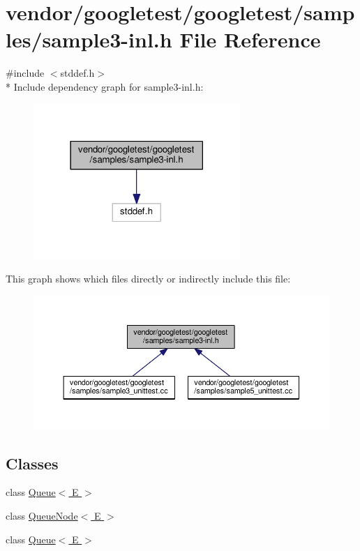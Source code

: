 \hypertarget{sample3-inl_8h}{}\section{vendor/googletest/googletest/samples/sample3-\/inl.h File Reference}
\label{sample3-inl_8h}
{\ttfamily \#include $<$stddef.\+h$>$}\\*
Include dependency graph for sample3-\/inl.h\+:
\nopagebreak
\begin{figure}[H]
\begin{center}
\leavevmode
\includegraphics[width=222pt]{sample3-inl_8h__incl}
\end{center}
\end{figure}
This graph shows which files directly or indirectly include this file\+:
\nopagebreak
\begin{figure}[H]
\begin{center}
\leavevmode
\includegraphics[width=350pt]{sample3-inl_8h__dep__incl}
\end{center}
\end{figure}
\subsection*{Classes}
\begin{DoxyCompactItemize}
\item 
class \hyperlink{classQueue}{Queue$<$ E $>$}
\item 
class \hyperlink{classQueueNode}{Queue\+Node$<$ E $>$}
\item 
class \hyperlink{classQueue}{Queue$<$ E $>$}
\end{DoxyCompactItemize}

